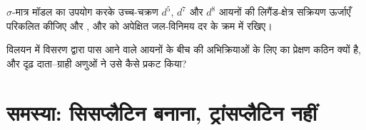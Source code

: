 \begin{exercise}[$\star\star\star$]\label{exo:b3:complex-mechanisms:11}
$\sigma$-मात्र मॉडल का उपयोग करके उच्च-चक्रण $d^5$, $d^7$ और $d^8$ आयनों की लिगैंड-क्षेत्र सक्रियण ऊर्जाएँ
परिकलित कीजिए और ,  और  को अपेक्षित
जल-विनिमय दर के क्रम में रखिए।
\end{exercise}

\begin{exercise}[$\star\star\star$]\label{exo:b3:complex-mechanisms:12}
विलयन में विसरण द्वारा पास आने वाले आयनों के बीच की अभिक्रियाओं के लिए  का प्रेक्षण
कठिन क्यों है, और दृढ़ दाता--ग्राही अणुओं ने उसे कैसे प्रकट
किया?
\end{exercise}

\section{समस्या: सिसप्लैटिन बनाना, ट्रांसप्लैटिन नहीं}

